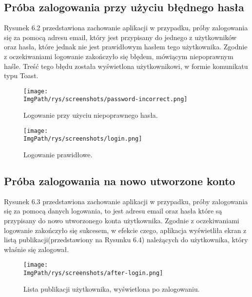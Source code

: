 \documentclass[a4paper,12pt,twoside,openany]{report}
\newcommand{\ImgPath}{.}
\begin{document}
\subsection{Próba zalogowania przy użyciu błędnego hasła}
Rysunek 6.2  przedstawiona zachowanie aplikacji w przypadku, próby zalogowania się za pomocą adresu email, który jest przypisany do jednego z użytkowników oraz hasła, które jednak nie jest prawidłowym hasłem tego użytkownika. Zgodnie z oczekiwaniami logowanie zakończyło się błędem, mówiącym niepoprawnym haśle. Treść tego błędu została wyświetlona użytkownikowi, w formie komunikatu typu Toast.

\pagebreak

\begin{figure}[!htbp]
	\begin{center}
		\centering
		\texttt{[image: \\ImgPath/rys/screenshots/password-incorrect.png]}
	\end{center}
	\caption{Logowanie przy użyciu niepoprawnego hasła.}
	\label{zrzutLogowaniePoprawne}
\end{figure}

\begin{figure}[!htbp]
	\begin{center}
		\centering
		\texttt{[image: \\ImgPath/rys/screenshots/login.png]}
	\end{center}
	\caption{Logowanie prawidłowe.}
	\label{zrzutLogowaniePoprawne}
\end{figure}


\subsection{Próba zalogowania na nowo utworzone konto}
Rysunek 6.3  przedstawiona zachowanie aplikacji w przypadku, próby zalogowania się za pomocą danych logowania, to jest adresu email oraz hasła które są przypisany do nowo utworzonego konta użytkownika. Zgodnie z oczekiwaniami logowanie zakończyło się sukcesem, w efekcie czego, aplikacja wyświetliła ekran z listą publikacji(przedstawiony na Rysunku 6.4) należących do użytkownika, który właśnie się zalogował. 




\begin{figure}[!htbp]
	\begin{center}
		\centering
		\texttt{[image: \\ImgPath/rys/screenshots/after-login.png]}
	\end{center}
	\caption{Lista publikacji użytkownika, wyświetlona po zalogowaniu.}
	\label{diagramAktywnosciMobDodEdyt}
\end{figure}
\end{document}

